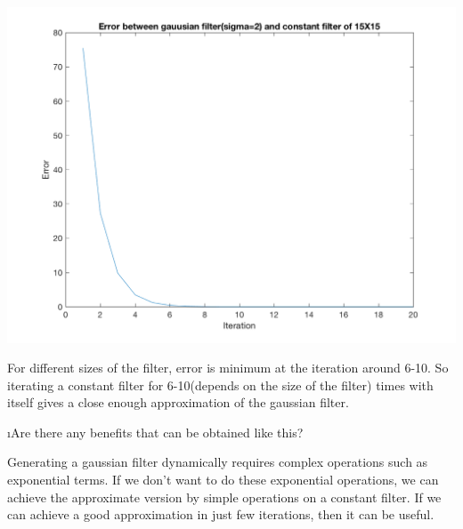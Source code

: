 \documentclass[fleqn]{article}
\begin{document}
\includegraphics[scale=0.8]{Error15.png}

For different sizes of the filter, error is minimum at the iteration around 6-10. So iterating a constant filter for 6-10(depends on the size of the filter) times with itself gives a close enough approximation of the gaussian filter.

\vspace{1in}
\i Are there any benefits that can be obtained like this?
\vspace{1in}
\ene
\begin{solution}
Generating a gaussian filter dynamically requires complex operations such as exponential terms. If we don't want to do these exponential operations, we can achieve the approximate version by simple operations on a constant filter.
If we can achieve a good approximation in just few iterations, then it can be useful. 
\end{solution}
\ene
\end{document}
